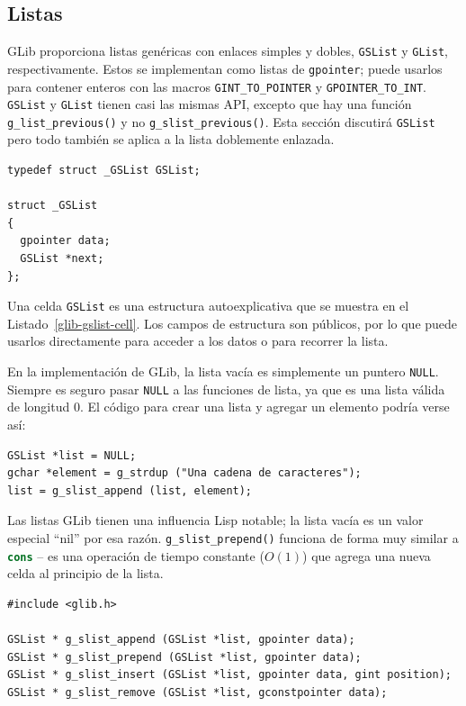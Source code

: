 \subsection{Listas}

GLib proporciona listas genéricas con enlaces simples y dobles, \lstinline{GSList} y \lstinline{GList}, respectivamente. Estos se implementan como listas de \lstinline{gpointer}; puede usarlos para contener enteros con las macros \lstinline{GINT_TO_POINTER} y \lstinline{GPOINTER_TO_INT}. \lstinline{GSList} y \lstinline{GList} tienen casi las mismas API, excepto que hay una función \lstinline{g_list_previous()} y no \lstinline{g_slist_previous()}. Esta sección discutirá \lstinline{GSList} pero todo también se aplica a la lista doblemente enlazada.

\begin{lstlisting}[style=GLib/GTK, caption={Celda \lstinline{GSList}}, label=glib-gslist-cell]
typedef struct _GSList GSList;

struct _GSList
{
  gpointer data;
  GSList *next;
};
\end{lstlisting}

Una celda \lstinline{GSList} es una estructura autoexplicativa que se muestra en el Listado~\ref{glib-gslist-cell}. Los campos de estructura son públicos, por lo que puede usarlos directamente para acceder a los datos o para recorrer la lista.

En la implementación de GLib, la lista vacía es simplemente un puntero \lstinline{NULL}. Siempre es seguro pasar \lstinline{NULL} a las funciones de lista, ya que es una lista válida de longitud 0. El código para crear una lista y agregar un elemento podría verse así:
\begin{lstlisting}[style=GLib/GTK]
GSList *list = NULL;
gchar *element = g_strdup ("Una cadena de caracteres");
list = g_slist_append (list, element);
\end{lstlisting}

Las listas GLib tienen una influencia Lisp notable; la lista vacía es un valor especial ``nil'' por esa razón. \lstinline{g_slist_prepend()} funciona de forma muy similar a \lstinline[language=Lisp]{cons} -- es una operación de tiempo constante ($O(1)$) que agrega una nueva celda al principio de la lista.

\begin{lstlisting}[style=GLib/GTK, caption={Cambiar el contenido de la lista vinculada}, label=glib-listchanging]
#include <glib.h>

GSList * g_slist_append (GSList *list, gpointer data);
GSList * g_slist_prepend (GSList *list, gpointer data);
GSList * g_slist_insert (GSList *list, gpointer data, gint position);
GSList * g_slist_remove (GSList *list, gconstpointer data);
\end{lstlisting}

